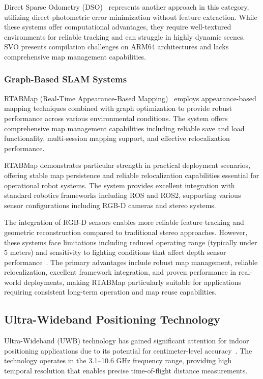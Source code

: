 Direct Sparse Odometry (DSO)~\cite{engel2017direct} represents another approach in this category, utilizing direct photometric error minimization without feature extraction. While these systems offer computational advantages, they require well-textured environments for reliable tracking and can struggle in highly dynamic scenes. SVO presents compilation challenges on ARM64 architectures and lacks comprehensive map management capabilities.

\subsubsection{Graph-Based SLAM Systems}
RTABMap (Real-Time Appearance-Based Mapping)~\cite{labbe2019rtab} employs appearance-based mapping techniques combined with graph optimization to provide robust performance across various environmental conditions. The system offers comprehensive map management capabilities including reliable save and load functionality, multi-session mapping support, and effective relocalization performance.

RTABMap demonstrates particular strength in practical deployment scenarios, offering stable map persistence and reliable relocalization capabilities essential for operational robot systems. The system provides excellent integration with standard robotics frameworks including ROS and ROS2, supporting various sensor configurations including RGB-D cameras and stereo systems.

The integration of RGB-D sensors enables more reliable feature tracking and geometric reconstruction compared to traditional stereo approaches. However, these systems face limitations including reduced operating range (typically under 5 meters) and sensitivity to lighting conditions that affect depth sensor performance~\cite{henry2012rgb}. The primary advantages include robust map management, reliable relocalization, excellent framework integration, and proven performance in real-world deployments, making RTABMap particularly suitable for applications requiring consistent long-term operation and map reuse capabilities.

\subsection{Ultra-Wideband Positioning Technology}
Ultra-Wideband (UWB) technology has gained significant attention for indoor positioning applications due to its potential for centimeter-level accuracy~\cite{gezici2005localization}. The technology operates in the 3.1--10.6 GHz frequency range, providing high temporal resolution that enables precise time-of-flight distance measurements.


